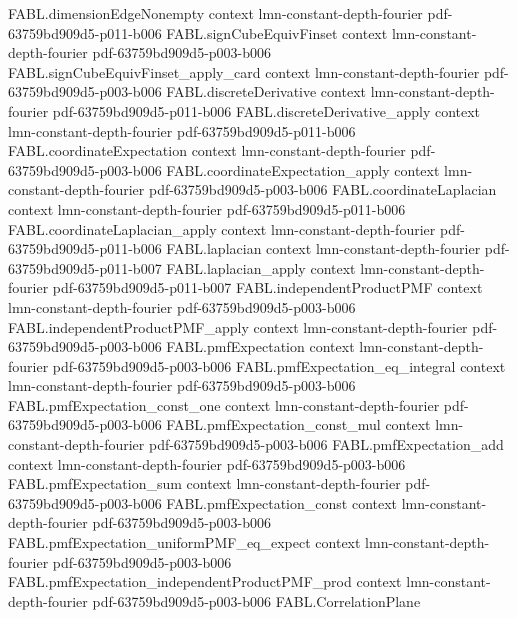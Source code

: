 \begin{theorem}
  {FABL.dimensionEdgeNonempty}
  {context}
  {lmn-constant-depth-fourier}
  {pdf-63759bd909d5-p011-b006}
\proofstep
  {FABL.signCubeEquivFinset}
  {context}
  {lmn-constant-depth-fourier}
  {pdf-63759bd909d5-p003-b006}
\proofstep
  {FABL.signCubeEquivFinset_apply_card}
  {context}
  {lmn-constant-depth-fourier}
  {pdf-63759bd909d5-p003-b006}
\proofstep
  {FABL.discreteDerivative}
  {context}
  {lmn-constant-depth-fourier}
  {pdf-63759bd909d5-p011-b006}
\proofstep
  {FABL.discreteDerivative_apply}
  {context}
  {lmn-constant-depth-fourier}
  {pdf-63759bd909d5-p011-b006}
\proofstep
  {FABL.coordinateExpectation}
  {context}
  {lmn-constant-depth-fourier}
  {pdf-63759bd909d5-p003-b006}
\proofstep
  {FABL.coordinateExpectation_apply}
  {context}
  {lmn-constant-depth-fourier}
  {pdf-63759bd909d5-p003-b006}
\proofstep
  {FABL.coordinateLaplacian}
  {context}
  {lmn-constant-depth-fourier}
  {pdf-63759bd909d5-p011-b006}
\proofstep
  {FABL.coordinateLaplacian_apply}
  {context}
  {lmn-constant-depth-fourier}
  {pdf-63759bd909d5-p011-b006}
\proofstep
  {FABL.laplacian}
  {context}
  {lmn-constant-depth-fourier}
  {pdf-63759bd909d5-p011-b007}
\proofstep
  {FABL.laplacian_apply}
  {context}
  {lmn-constant-depth-fourier}
  {pdf-63759bd909d5-p011-b007}
\proofstep
  {FABL.independentProductPMF}
  {context}
  {lmn-constant-depth-fourier}
  {pdf-63759bd909d5-p003-b006}
\proofstep
  {FABL.independentProductPMF_apply}
  {context}
  {lmn-constant-depth-fourier}
  {pdf-63759bd909d5-p003-b006}
\proofstep
  {FABL.pmfExpectation}
  {context}
  {lmn-constant-depth-fourier}
  {pdf-63759bd909d5-p003-b006}
\proofstep
  {FABL.pmfExpectation_eq_integral}
  {context}
  {lmn-constant-depth-fourier}
  {pdf-63759bd909d5-p003-b006}
\proofstep
  {FABL.pmfExpectation_const_one}
  {context}
  {lmn-constant-depth-fourier}
  {pdf-63759bd909d5-p003-b006}
\proofstep
  {FABL.pmfExpectation_const_mul}
  {context}
  {lmn-constant-depth-fourier}
  {pdf-63759bd909d5-p003-b006}
\proofstep
  {FABL.pmfExpectation_add}
  {context}
  {lmn-constant-depth-fourier}
  {pdf-63759bd909d5-p003-b006}
\proofstep
  {FABL.pmfExpectation_sum}
  {context}
  {lmn-constant-depth-fourier}
  {pdf-63759bd909d5-p003-b006}
\proofstep
  {FABL.pmfExpectation_const}
  {context}
  {lmn-constant-depth-fourier}
  {pdf-63759bd909d5-p003-b006}
\proofstep
  {FABL.pmfExpectation_uniformPMF_eq_expect}
  {context}
  {lmn-constant-depth-fourier}
  {pdf-63759bd909d5-p003-b006}
\proofstep
  {FABL.pmfExpectation_independentProductPMF_prod}
  {context}
  {lmn-constant-depth-fourier}
  {pdf-63759bd909d5-p003-b006}
\proofstep
  {FABL.CorrelationPlane}

\end{theorem}
